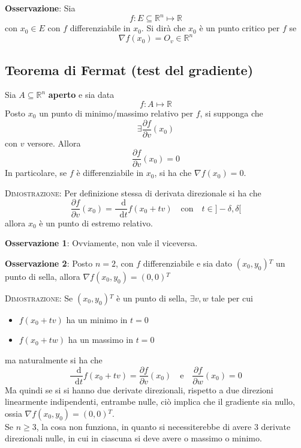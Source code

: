 \documentclass[a4paper]{extarticle}
\newcommand*\dif{\mathop{}\!\mathrm{d}}
\begin{document}
\vspace{1em}
\noindent
\textbf{Osservazione}: Sia
\[f : E \subseteq \mathbb{R}^n \longmapsto \mathbb{R}\]
con $x_0 \in E$ con $f$ differenziabile in $x_0$. Si dirà che $x_0$ è un punto critico per $f$ se
\[\nabla f(x_0) = O_v \in \mathbb{R}^n\]

\vspace{1em}
\subsection{Teorema di Fermat (test del gradiente)}
Sia $A \subseteq \mathbb{R}^n$ \textbf{aperto} e sia data
\[f : A \longmapsto \mathbb{R}\]
Posto $x_0$ un punto di minimo/massimo relativo per $f$, si supponga che
\[\exists \dfrac{\partial f}{\partial v}(x_0)\]
con $v$ versore. Allora 
\[\dfrac{\partial f}{\partial v}(x_0) = 0\]
In particolare, se $f$ è differenziabile in $x_0$, si ha che $\nabla f(x_0) = 0$.

\vspace{2em}
\noindent
\normalfont \normalsize
\textsc{Dimostrazione}: Per definizione stessa di derivata direzionale si ha che
\[\dfrac{\partial f}{\partial v} (x_0) = \dfrac{\dif}{\dif t} f(x_0+tv) \hspace{1em} \text{con} \hspace{1em} t \in ]-\delta,\delta[\]
allora $x_0$ è un punto di estremo relativo.

\vspace{1em}
\noindent
\textbf{Osservazione 1}: Ovviamente, non vale il viceversa.

\vspace{1em}
\noindent
\textbf{Osservazione 2}: Posto $n=2$, con $f$ differenziabile e sia dato $(x_0,y_0){^T}$ un punto di sella, allora $\nabla f(x_0,y_0) = (0,0){^T}$

\vspace{2em}
\noindent
\normalfont \normalsize
\textsc{Dimostrazione}: Se $(x_0,y_0){^T}$ è un punto di sella, $\exists v, w$ tale per cui
\begin{itemize}
    \item $f(x_0+tv)$ ha un minimo in $t=0$
    \item $f(x_0+tw)$ ha un massimo in $t=0$
\end{itemize}
ma naturalmente si ha che
\[\dfrac{\dif}{\dif t} f(x_0+tv) = \dfrac{\partial f}{\partial v}(x_0) \hspace{1em} \text{e} \hspace{1em} \dfrac{\partial f}{\partial w}(x_0)=0\]
Ma quindi se si si hanno due derivate direzionali, rispetto a due direzioni linearmente indipendenti, entrambe nulle, ciò implica che il gradiente sia nullo, ossia $\nabla f(x_0,y_0)=(0,0){^T}$.\\
Se $n \geq 3$, la cosa non funziona, in quanto si necessiterebbe di avere $3$ derivate direzionali nulle, in cui in ciascuna si deve avere o massimo o minimo.
\end{document}
